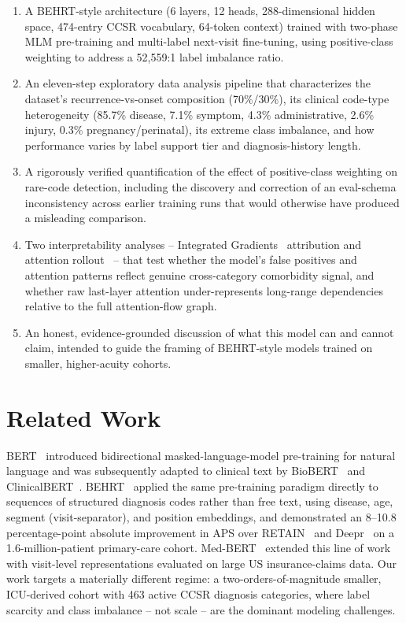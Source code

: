 \documentclass[11pt]{article}
\begin{document}
\begin{enumerate}
  \item A BEHRT-style architecture (6 layers, 12 heads, 288-dimensional
    hidden space, 474-entry CCSR vocabulary, 64-token context) trained with
    two-phase MLM pre-training and multi-label next-visit fine-tuning, using
    positive-class weighting to address a 52{,}559:1 label imbalance ratio.
  \item An eleven-step exploratory data analysis pipeline that characterizes
    the dataset's recurrence-vs-onset composition (70\%/30\%), its clinical
    code-type heterogeneity (85.7\% disease, 7.1\% symptom, 4.3\%
    administrative, 2.6\% injury, 0.3\% pregnancy/perinatal), its extreme
    class imbalance, and how performance varies by label support tier and
    diagnosis-history length.
  \item A rigorously verified quantification of the effect of positive-class
    weighting on rare-code detection, including the discovery and correction
    of an eval-schema inconsistency across earlier training runs that would
    otherwise have produced a misleading comparison.
  \item Two interpretability analyses -- Integrated
    Gradients~\cite{sundararajan2017axiomatic} attribution and attention
    rollout~\cite{abnar2020quantifying} -- that test whether the model's false
    positives and attention patterns reflect genuine cross-category
    comorbidity signal, and whether raw last-layer attention under-represents
    long-range dependencies relative to the full attention-flow graph.
  \item An honest, evidence-grounded discussion of what this model can and
    cannot claim, intended to guide the framing of BEHRT-style models trained
    on smaller, higher-acuity cohorts.
\end{enumerate}

\section{Related Work}

BERT~\cite{devlin2019bert} introduced bidirectional masked-language-model
pre-training for natural language and was subsequently adapted to clinical
text by BioBERT~\cite{lee2020biobert} and
ClinicalBERT~\cite{alsentzer2019clinicalbert}. BEHRT~\cite{li2020behrt} applied
the same pre-training paradigm directly to sequences of structured diagnosis
codes rather than free text, using disease, age, segment (visit-separator),
and position embeddings, and demonstrated an 8--10.8 percentage-point absolute
improvement in APS over RETAIN~\cite{choi2016retain} and
Deepr~\cite{nguyen2017deepr} on a 1.6-million-patient primary-care cohort.
Med-BERT~\cite{rasmy2021medbert} extended this line of work with visit-level
representations evaluated on large US insurance-claims data. Our work targets
a materially different regime: a two-orders-of-magnitude smaller, ICU-derived
cohort with 463 active CCSR diagnosis categories, where label scarcity and
class imbalance -- not scale -- are the dominant modeling challenges.
\end{document}
